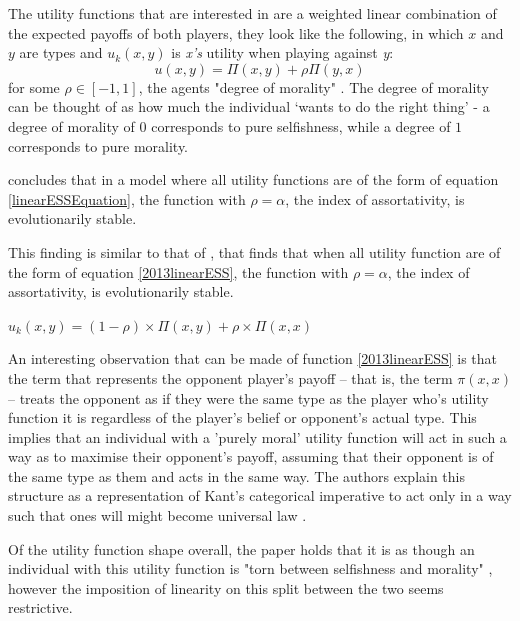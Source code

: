 \documentclass[11pt]{book}
\newcommand*{\np}{\par\noindent\newline}
\begin{document}
\np The utility functions that \citet{alger_generalization_2012} are interested in are a weighted linear combination of the expected payoffs of both players, they look like the following, in which $x$ and $y$ are types and $u_k(x, y)$ is \textit{x's} utility when playing against \textit{y}:
\begin{equation}
	\label{linearESSEquation}
	u(x, y) = \Pi(x,y) + \rho\Pi(y,x)
\end{equation}
for some $\rho \in [-1, 1]$, the agents "degree of morality" \citep[~p 2274.]{alger_homo_2013}. The degree of morality can
be thought of as how much the individual `wants to do the right thing' - a degree of morality of $0$ corresponds to pure
selfishness, while a degree of $1$ corresponds to pure morality. 

\citet{alger_generalization_2012} concludes that in a model where all utility functions are of the form of equation \ref{linearESSEquation}, the function with $\rho = \alpha$, the index of assortativity, is evolutionarily stable.

This finding is similar to that of \citet{alger_homo_2013}, that finds that when all utility function are of the form of equation \ref{2013linearESS}, the function with $\rho = \alpha$, the index of assortativity, is evolutionarily stable.
\begin{center}
	\label{2013linearESS}
	$u_k(x, y) = (1 - \rho) \times \Pi(x, y) + \rho \times \Pi(x, x)$
\end{center}

An interesting observation that can be made of function \ref{2013linearESS} is that the term that represents the opponent player's payoff -- that is, the term $\pi(x,x)$ -- treats the
opponent as if they were the same type as the player who's utility function it is regardless of the player's belief or opponent's actual type. This implies that an individual with a 'purely moral' utility function will act in such a way as to maximise their opponent's payoff, assuming that their opponent is of the same type as them and acts in the same way. The authors explain this structure as a representation of Kant's categorical imperative to act only in a way such that ones will might become universal law \citep{kant_groundwork_1775}.

\np Of the utility function shape overall, the paper holds that it is as though an individual with this utility function is
 "torn between selfishness and morality" \citep[~p. 2276]{alger_homo_2013}, 
 however the imposition of linearity on this split between the two seems restrictive. 
 
\end{document}
